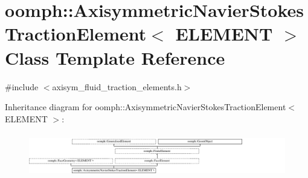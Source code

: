 \hypertarget{classoomph_1_1AxisymmetricNavierStokesTractionElement}{}\section{oomph\+:\+:Axisymmetric\+Navier\+Stokes\+Traction\+Element$<$ E\+L\+E\+M\+E\+NT $>$ Class Template Reference}
\label{classoomph_1_1AxisymmetricNavierStokesTractionElement}


{\ttfamily \#include $<$axisym\+\_\+fluid\+\_\+traction\+\_\+elements.\+h$>$}

Inheritance diagram for oomph\+:\+:Axisymmetric\+Navier\+Stokes\+Traction\+Element$<$ E\+L\+E\+M\+E\+NT $>$\+:\begin{figure}[H]
\begin{center}
\leavevmode
\includegraphics[height=1.944445cm]{classoomph_1_1AxisymmetricNavierStokesTractionElement}
\end{center}
\end{figure}
